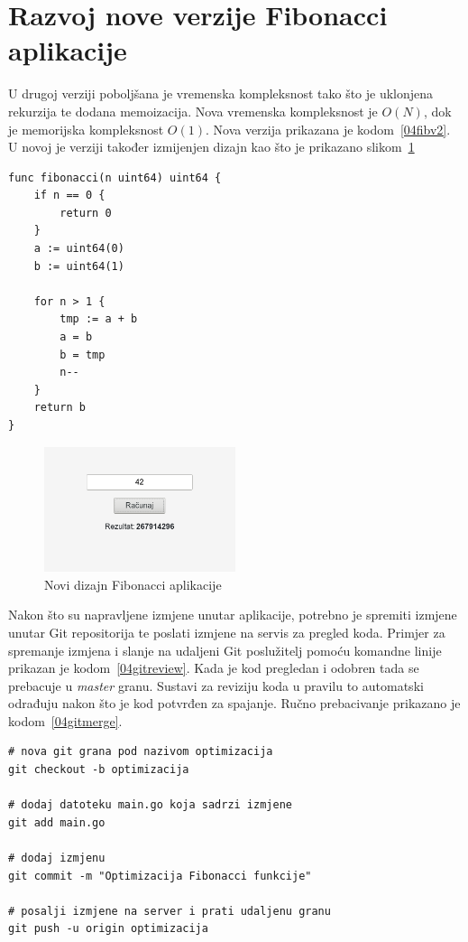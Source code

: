 \section{Razvoj nove verzije Fibonacci aplikacije}
U drugoj verziji poboljšana je vremenska kompleksnost tako što je uklonjena rekurzija te dodana
memoizacija. Nova vremenska kompleksnost je $O(N)$, dok je memorijska kompleksnost $O(1)$. Nova
verzija prikazana je kodom~\ref{04fibv2}. U novoj je verziji također izmijenjen dizajn kao što je
prikazano slikom~\ref{fig:04redesign}

\begin{lstlisting}[float=h]
func fibonacci(n uint64) uint64 {
	if n == 0 {
		return 0
	}
	a := uint64(0)
	b := uint64(1)

	for n > 1 {
		tmp := a + b
		a = b
		b = tmp
		n--
	}
	return b
}
\end{lstlisting}

\begin{figure}[h]
    \centering
    \includegraphics[width=0.5\textwidth]{img/04/new_app.png}
    \caption{Novi dizajn Fibonacci aplikacije}%
    \label{fig:04redesign}
\end{figure}

Nakon što su napravljene izmjene unutar aplikacije, potrebno je spremiti izmjene unutar Git
repositorija te poslati izmjene na servis za pregled koda. Primjer za spremanje izmjena i slanje na
udaljeni Git poslužitelj pomoću komandne linije prikazan je kodom~\ref{04gitreview}.  Kada je kod
pregledan i odobren tada se prebacuje u \textit{master} granu. Sustavi za reviziju koda u pravilu to
automatski odrađuju nakon što je kod potvrđen za spajanje. Ručno prebacivanje prikazano je
kodom~\ref{04gitmerge}.

\begin{lstlisting}[float=h]
# nova git grana pod nazivom optimizacija
git checkout -b optimizacija

# dodaj datoteku main.go koja sadrzi izmjene
git add main.go

# dodaj izmjenu
git commit -m "Optimizacija Fibonacci funkcije"

# posalji izmjene na server i prati udaljenu granu
git push -u origin optimizacija
\end{lstlisting}

